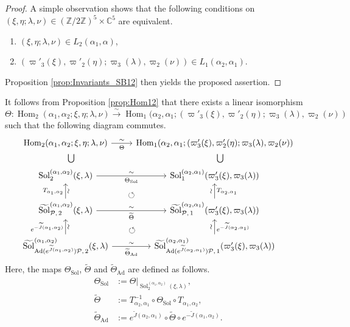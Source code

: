 \documentclass[a4paper,11pt,reqno]{amsart}
\newcommand{\calP}{\mathcal{P}}
\newcommand{\0}{{\bf 0}}
\newcommand{\Z}{\mathbb{Z}}
\newcommand{\C}{\mathbb{C}}
\newcommand{\1}{{\bf 1}}
\DeclareMathOperator{\Ad}{Ad}
\DeclareMathOperator{\Hom}{Hom}
\DeclareMathOperator{\Sol}{Sol}
\newcommand{\wJ}{\widetilde{J}}
\DeclareMathOperator{\To}{\longrightarrow}
\DeclareMathOperator{\wSol}{\widetilde{\Sol}}
\theoremstyle{plain}
\theoremstyle{definition}
\numberwithin{equation}{section}
\theoremstyle{definition}
\begin{document}
\begin{proof}
A simple observation shows that 
the following conditions 
on $(\xi,\eta; \lambda,\nu) \in (\Z/2\Z)^5\times \C^5$ are equivalent.
\begin{enumerate}[label=\normalfont{(\roman*)}]
\item $(\xi,\eta; \lambda,\nu) \in L_2(\alpha_1,\alpha)$,
\vspace{3pt}
\item $(\varpi'_3(\xi), \varpi'_2(\eta); \varpi_3(\lambda), \varpi_2(\nu)) 
\in L_1(\alpha_2,\alpha_1)$.
\end{enumerate}
Proposition \ref{prop:Invariants_SB12} then yields the proposed assertion.
\end{proof}

It follows from Proposition \ref{prop:Hom12} that there exists 
a linear isomorphism
\begin{equation*}
\Theta \colon 
\Hom_2(\alpha_1,\alpha_2;\xi,\eta; \lambda,\nu)
\stackrel{\sim}{\To}
\Hom_1(\alpha_2,\alpha_1;(\varpi'_3(\xi), \varpi'_2(\eta); \varpi_3(\lambda), \varpi_2(\nu))
\end{equation*}
such that the following diagram commutes.
\begin{equation}\label{eqn:diagram12}
\begin{tikzcd}
\Hom_2(\alpha_1,\alpha_2;\xi,\eta; \lambda,\nu)
\ar[r, "\sim" sloped, "\Theta"'] 
\ar[draw=none]{d}{\bigcup}
& 
\Hom_1(\alpha_2,\alpha_1;(\varpi'_3(\xi), \varpi'_2(\eta); \varpi_3(\lambda), \varpi_2(\nu))
\ar[draw=none]{d}{\bigcup}
\\
\Sol^{(\alpha_1,\alpha_2)}_2(\xi,\lambda)
  \arrow[r, "\sim", "\Theta_{\Sol}"']
 & 
\Sol^{(\alpha_2,\alpha_1)}_1(\varpi'_3(\xi),\varpi_3(\lambda))\\
\wSol_{\calP,\, 2}^{(\alpha_1,\alpha_2)}(\xi,\lambda) 
  \arrow[r, "\sim", "\widetilde{\Theta}"']
  \arrow[u, "T_{\alpha_1,\alpha_2}", "\sim"' sloped]
  \arrow[ur,  pos=0.41, phantom, "\circlearrowleft"]
 & 
\wSol_{\calP,\, 1}^{(\alpha_2, \alpha_1)}(\varpi_3'(\xi),\varpi_3(\lambda))
\arrow[u, "\sim" sloped, "T_{\alpha_2,\alpha_1}"']\\
 \wSol_{\Ad(e^{\wJ(\alpha_1,\alpha_2)}) \calP,\, 2}^{(\alpha_1,\alpha_2)}(\xi,\lambda)
  \arrow[r, "\sim", "\widetilde{\Theta}_{\Ad}"']
  \arrow[u, "e^{-\wJ(\alpha_1,\alpha_2)}", "\sim"' sloped]
  \arrow[ur,  pos=0.3, phantom, "\circlearrowleft"]  
 & 
\wSol_{\Ad(e^{\wJ(\alpha_2,\alpha_1)}) \calP,\, 1}^{(\alpha_2, \alpha_1)}(\varpi_3'(\xi),\varpi_3(\lambda))
\arrow[u, "\sim" sloped, "e^{-\wJ(\alpha_2,\alpha_1)}"']
\end{tikzcd}
\end{equation}
Here, the maps $\Theta_{\Sol}$, 
$\widetilde{\Theta}$ and $\widetilde{\Theta}_{\Ad}$ are defined as follows.
\begin{align}
\Theta_{\Sol}&:=\Theta\big\vert_{\Sol^{(\alpha_1,\alpha_2)}_2(\xi,\lambda)},
\nonumber\\[3pt]
\widetilde{\Theta}&:= 
T^{-1}_{\alpha_2,\alpha_1} \circ \Theta_{\Sol} \circ T_{\alpha_1,\alpha_2},
\nonumber\\[3pt]
\widetilde{\Theta}_{\Ad}
&:=
e^{\wJ(\alpha_2,\alpha_1)}
\circ
\widetilde{\Theta}
\circ
e^{-\wJ(\alpha_1,\alpha_2)}.\label{eqn:wTheta_Ad}
\end{align}
\end{document}
